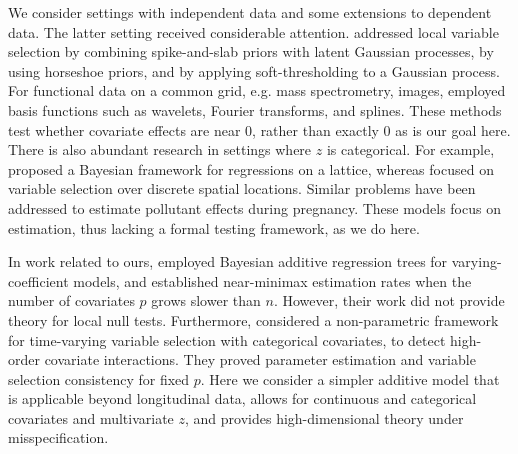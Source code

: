 We consider settings with independent data %
and some extensions to dependent data. The latter setting received considerable attention.
\cite{boehm:2015} addressed local variable selection by combining spike-and-slab priors with latent Gaussian processes, \cite{jhuang:2019} by using horseshoe priors, and \cite{kang:2018} by applying soft-thresholding to a Gaussian process. For functional data on a common grid, e.g. mass spectrometry, images, \cite{morris:2011} %
employed basis functions such as wavelets, Fourier transforms, and splines. 
These methods test whether covariate effects are near 0, rather than exactly 0 as is our goal here. There is also abundant research in settings where $z$ is categorical. For example, \cite{smith_michael:2007} proposed a Bayesian framework for regressions on a lattice, whereas \cite{scheel:2013} %
focused on variable selection over discrete spatial locations.
 Similar problems have been addressed \citep{warren2012,wilson2017} to estimate pollutant effects during pregnancy. These models focus on estimation, thus lacking a formal testing framework, as we do here. 

In work related to ours, \cite{deshpande:2024} employed Bayesian additive regression trees for varying-coefficient models, %
and established near-minimax estimation rates when the number of covariates $p$ grows slower than $n$.
 However, their work did not provide theory for local null tests. Furthermore,  \cite{paulon:2023}  considered a non-parametric framework for time-varying variable selection with categorical covariates, to detect high-order covariate interactions. They proved parameter estimation and variable selection consistency for fixed $p$. Here we consider a simpler additive model that is applicable beyond longitudinal data, allows for continuous and  categorical  covariates and multivariate $z$, and provides high-dimensional theory under misspecification.





